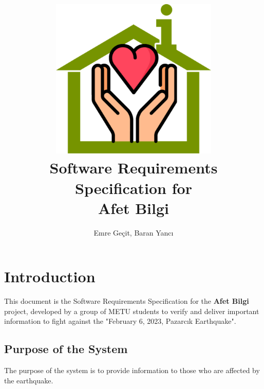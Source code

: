 \documentclass[a4paper]{article}
\author{Emre Geçit, Baran Yancı}
\begin{document}
    \title{\includegraphics[width=0.6\textwidth]{assets/favicon.png}\\ Software Requirements Specification for \\  \textbf{Afet Bilgi}}
    \maketitle

    \newpage
    \makeatletter
	\renewcommand\tableofcontents{%
		\null\hfill\textbf{\Large\contentsname}\hfill\null\par
		\@mkboth{\MakeUppercase\contentsname}{\MakeUppercase\contentsname}%
	}
	\makeatother

    \tableofcontents
    \listoffigures
    \listoftables
    \doublespacing

    \newpage

    \section{Introduction}
        This document is the Software Requirements Specification for the \textbf{Afet Bilgi} project, developed by a group of METU students to verify and deliver important information to fight against the "February 6, 2023, Pazarcık Earthquake".
        \subsection{Purpose of the System}

            The purpose of the system is to provide information to those who are affected by the earthquake.
\end{document}
